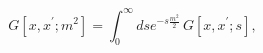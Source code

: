 \begin{equation}
   G[x,x^{'}; m^2] = \int_0^\infty d s e^{-s\frac{m^2}{2} } \, G[x,x^{'}; s],
   \label{8}
   \end{equation}

